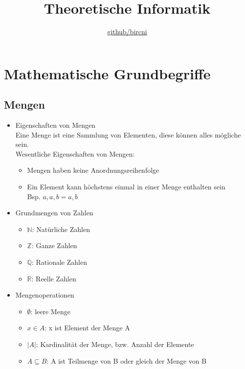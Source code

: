 \documentclass{scrreprt}
\title{\textbf{Theoretische Informatik}}
\author{\href{https://github.com/bircni}{\color{black}github/bircni}}
\date{}
\begin{document}
\maketitle
\pagebreak
\renewcommand{\contentsname}{Inhaltsverzeichnis}
\setcounter{tocdepth}{1}
\tableofcontents
{}
\pagebreak
{}
\chapter{Mathematische Grundbegriffe}
\section{Mengen}
\begin{itemize}
    \item Eigenschaften von Mengen
    \\Eine Menge ist eine Sammlung von Elementen, diese können alles mögliche sein.
    \\Wesentliche Eigenschaften von Mengen:
    \begin{itemize}
        \item Mengen haben keine Anordnungsreihenfolge
        \item Ein Element kann höchstens einmal in einer Menge enthalten sein
        \\Bsp. ${a,a,b}={a,b}$
    \end{itemize}
    \item Grundmengen von Zahlen
    \begin{itemize}
        \item $\mathbb{N}$: Natürliche Zahlen
        \item $\mathbb{Z}$: Ganze Zahlen
        \item $\mathbb{Q}$: Rationale Zahlen
        \item $\mathbb{R}$: Reelle Zahlen
    \end{itemize}
    \item Mengenoperationen
    \begin{itemize}
        \item $\emptyset$: leere Menge
        \item $x \in A$: x ist Element der Menge A
        \item $|A|$: Kardinalität der Menge, bzw. Anzahl der Elemente
        \item $A \subseteq B$: A ist Teilmenge von B oder gleich der Menge von B

\end{itemize}
\end{itemize}
\end{document}

